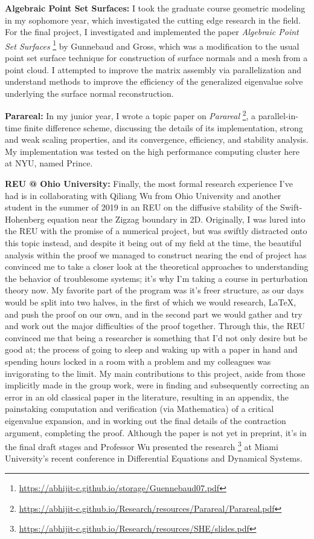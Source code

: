 \documentclass[11pt]{article}
\begin{document}
{\bf Algebraic Point Set Surfaces:} I took the graduate course geometric
modeling in my sophomore year, which investigated the cutting edge research in
the field. For the final project, I investigated and implemented the paper {\em
Algebraic Point Set Surfaces}%
\footnote{\url{https://abhijit-c.github.io/storage/Guennebaud07.pdf}}
by Gunnebaud and Gross, which was a modification
to the usual point set surface technique for construction of surface normals and
a mesh from a point cloud. I attempted to improve the matrix assembly via
parallelization and understand methods to improve the efficiency of the
generalized eigenvalue solve underlying the surface normal reconstruction.

{\bf Parareal:} In my junior year, I wrote a topic paper on {\em Parareal}%
\footnote{\url{https://abhijit-c.github.io/Research/resources/Parareal/Parareal.pdf}},
a parallel-in-time finite difference scheme, discussing the details of its
implementation, strong and weak scaling properties, and its convergence,
efficiency, and stability analysis. My implementation was tested on the high
performance computing cluster here at NYU, named Prince.

{\bf REU @ Ohio University:} Finally, the most formal research experience I've
had is in collaborating with Qiliang Wu from Ohio University and another student
in the summer of 2019 in an REU on the diffusive stability of the
Swift-Hohenberg equation near the Zigzag boundary in 2D. Originally, I was lured
into the REU with the promise of a numerical project, but was swiftly distracted
onto this topic instead, and despite it being out of my field at the time, the
beautiful analysis within the proof we managed to construct nearing the end of
project has convinced me to take a closer look at the theoretical approaches to
understanding the behavior of troublesome systems; it's why I'm taking a course
in perturbation theory now.  My favorite part of the program was it's freer
structure, as our days would be split into two halves, in the first of which we
would research, \LaTeX, and push the proof on our own, and in the second part we
would gather and try and work out the major difficulties of the proof together.
Through this, the REU convinced me that being a researcher is something that I'd
not only desire but be good at; the process of going to sleep and waking up with
a paper in hand and spending hours locked in a room with a problem and my
colleagues was invigorating to the limit. My main contributions to this project,
aside from those implicitly made in the group work, were in finding and
subsequently correcting an error in an old classical paper in the literature,
resulting in an appendix, the painstaking computation and verification (via
Mathematica) of a critical eigenvalue expansion, and in working out the final
details of the contraction argument, completing the proof.
Although the paper is not yet in preprint, it's in the final draft stages and
Professor Wu presented the research%
\footnote{\url{https://abhijit-c.github.io/Research/resources/SHE/slides.pdf}}
at Miami University's recent conference in Differential Equations and Dynamical
Systems.
\end{document}
